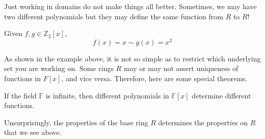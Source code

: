   Just working in domains do not make things all better. Sometimes, we may have two different polynomials but they may define the same function from $R$ to $R$! 

  \begin{example}
    Given $f, g \in \mathbb{Z}_2 [x]$, 
    \begin{equation}
      f(x) = x \sim g(x) = x^2
    \end{equation} 
  \end{example}

  As shown in the example above, it is not so simple as to restrict which underlying set you are working on. Some rings $R$ may or may not assert uniqueness of functions in $F[x]$, and vice versa. Therefore, here are some special theorems. 

  \begin{theorem}
    If the field $\mathbb{F}$ is infinite, then different polynomials in $\mathbb{F}[x]$ determine different functions. 
  \end{theorem}
  
  Unsurprisingly, the properties of the base ring $R$ determines the properties on $R$ that we see above. 

